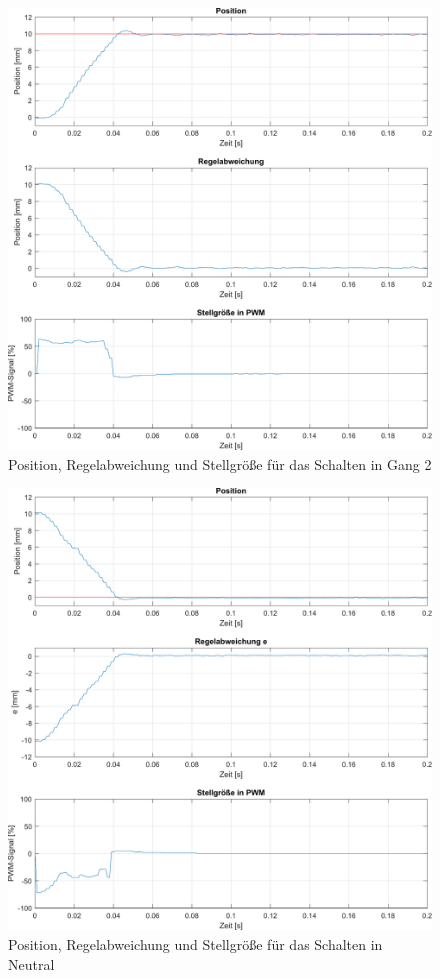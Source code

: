 \begin{figure} [H]
	\centering
	\includegraphics[width=1\columnwidth]{Bilder/shift_gear2_test.pdf}
	\caption{Position, Regelabweichung und Stellgröße für das Schalten in Gang 2}
	\label{fig:shift_gear2}
\end{figure}

\begin{figure} [H]
	\centering
	\includegraphics[width=1\linewidth]{Bilder/shift_toneutral.pdf}
	\caption{Position, Regelabweichung und Stellgröße für das Schalten in Neutral}
	\label{fig:shift_toneutral}
\end{figure}

